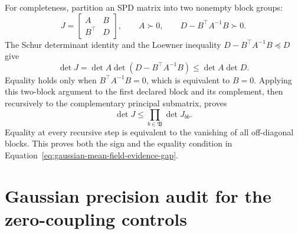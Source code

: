 For completeness, partition an SPD matrix into two nonempty block groups:
\begin{equation}
J=\begin{bmatrix}A&B\\B^\top&D\end{bmatrix},
\qquad
A\succ0,
\qquad
D-B^\top A^{-1}B\succ0.
\label{eq:appendix-fischer-two-block-partition}
\end{equation}
The Schur determinant identity and the Loewner inequality \(D-B^\top A^{-1}B\preceq D\) give
\begin{equation}
\det J
=\det A\det(D-B^\top A^{-1}B)
\leq\det A\det D.
\label{eq:appendix-fischer-two-block-proof}
\end{equation}
Equality holds only when \(B^\top A^{-1}B=0\), which is equivalent to \(B=0\). Applying this two-block argument to the first declared block and its complement, then recursively to the complementary principal submatrix, proves
\begin{equation}
\det J\leq\prod_{b\in\mathfrak B}\det J_{bb}.
\label{eq:appendix-fischer-multiblock-proof}
\end{equation}
Equality at every recursive step is equivalent to the vanishing of all off-diagonal blocks. This proves both the sign and the equality condition in Equation~\eqref{eq:gaussian-mean-field-evidence-gap}.

\section{Gaussian precision audit for the zero-coupling controls}
\label{sec:gaussian-zero-coupling-proof}

